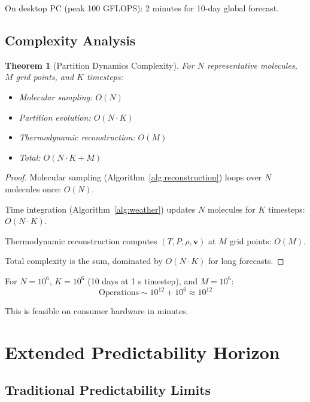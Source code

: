 \documentclass[twocolumn,10pt,a4paper]{article}
\newtheorem{theorem}{Theorem}[section]
\theoremstyle{definition}
\theoremstyle{remark}
\begin{document}
On desktop PC (peak 100 GFLOPS): 2 minutes for 10-day global forecast.

\subsection{Complexity Analysis}

\begin{theorem}[Partition Dynamics Complexity]
\label{thm:partition_complexity}
For $N$ representative molecules, $M$ grid points, and $K$ timesteps:
\begin{itemize}
    \item Molecular sampling: $O(N)$
    \item Partition evolution: $O(N \cdot K)$
    \item Thermodynamic reconstruction: $O(M)$
    \item Total: $O(N \cdot K + M)$
\end{itemize}
\end{theorem}

\begin{proof}
Molecular sampling (Algorithm~\ref{alg:reconstruction}) loops over $N$ molecules once: $O(N)$.

Time integration (Algorithm~\ref{alg:weather}) updates $N$ molecules for $K$ timesteps: $O(N \cdot K)$.

Thermodynamic reconstruction computes $(T,P,\rho,\mathbf{v})$ at $M$ grid points: $O(M)$.

Total complexity is the sum, dominated by $O(N \cdot K)$ for long forecasts.
\end{proof}

For $N = 10^6$, $K = 10^6$ (10 days at 1 s timestep), and $M = 10^6$:
\begin{equation}
    \text{Operations} \sim 10^{12} + 10^6 \approx 10^{12}
\end{equation}

This is feasible on consumer hardware in minutes.

\section{Extended Predictability Horizon}
\label{sec:extended}

\subsection{Traditional Predictability Limits}
\end{document}

